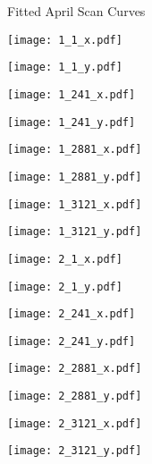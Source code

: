 \documentclass[8pt]{beamer}
\begin{document}
\begin{frame}
\centering
\large{Fitted April Scan Curves}
\end{frame}
\begin{frame}
\center
\texttt{[image: 1\_1\_x.pdf]}
\end{frame}
\begin{frame}
\center
\texttt{[image: 1\_1\_y.pdf]}
\end{frame}
\begin{frame}
\center
\texttt{[image: 1\_241\_x.pdf]}
\end{frame}
\begin{frame}
\center
\texttt{[image: 1\_241\_y.pdf]}
\end{frame}
\begin{frame}
\center
\texttt{[image: 1\_2881\_x.pdf]}
\end{frame}
\begin{frame}
\center
\texttt{[image: 1\_2881\_y.pdf]}
\end{frame}
\begin{frame}
\center
\texttt{[image: 1\_3121\_x.pdf]}
\end{frame}
\begin{frame}
\center
\texttt{[image: 1\_3121\_y.pdf]}
\end{frame}
\begin{frame}
\center
\texttt{[image: 2\_1\_x.pdf]}
\end{frame}
\begin{frame}
\center
\texttt{[image: 2\_1\_y.pdf]}
\end{frame}
\begin{frame}
\center
\texttt{[image: 2\_241\_x.pdf]}
\end{frame}
\begin{frame}
\center
\texttt{[image: 2\_241\_y.pdf]}
\end{frame}
\begin{frame}
\center
\texttt{[image: 2\_2881\_x.pdf]}
\end{frame}
\begin{frame}
\center
\texttt{[image: 2\_2881\_y.pdf]}
\end{frame}
\begin{frame}
\center
\texttt{[image: 2\_3121\_x.pdf]}
\end{frame}
\begin{frame}
\center
\texttt{[image: 2\_3121\_y.pdf]}
\end{frame}
\end{document}
